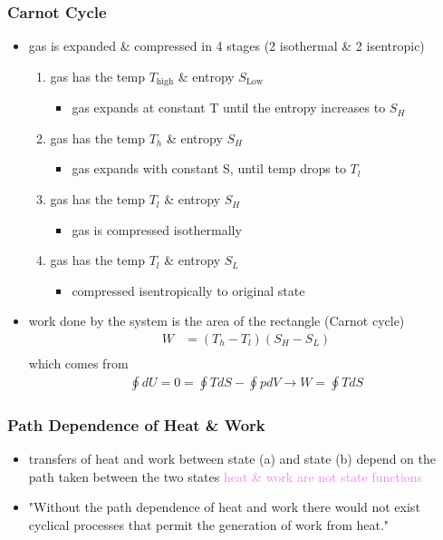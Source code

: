 \subsubsection{Carnot Cycle}
\begin{itemize}
	\item gas is expanded \& compressed in 4 stages (2 isothermal \& 2 isentropic)
	      \begin{enumerate}
		      \item gas has the temp $T_\text{high}$ \& entropy $S_\text{Low}$
		            \begin{itemize}
			            \item gas expands at constant T until the entropy increases to $S_H$
		            \end{itemize}
		      \item gas has the temp $T_h$ \& entropy $S_H$
		            \begin{itemize}
			            \item gas expands with constant S, until temp drops to $T_l$
		            \end{itemize}
		      \item gas has the temp $T_l$ \& entropy $S_H$
		            \begin{itemize}
			            \item gas is compressed isothermally
		            \end{itemize}
		      \item gas has the temp $T_l$ \& entropy $S_L$
		            \begin{itemize}
			            \item compressed isentropically to original state
		            \end{itemize}
	      \end{enumerate}
	\item work done by the system is the area of the rectangle (Carnot cycle)
	      \begin{align}
		      W & = (T_h - T_l) (S_H - S_L) \\
	      \end{align}
	      which comes from
	      \begin{align}
		      \oint dU = 0 = \oint TdS - \oint pdV \rightarrow W = \oint TdS
	      \end{align}
\end{itemize}


\subsubsection{Path Dependence of Heat \& Work }
\begin{itemize}
	\item transfers of heat and work between state (a) and state (b) depend on the path
	      taken between the two states \textcolor{violet}{heat \& work are not state functions}
	\item "Without the path dependence of heat and work there would not exist cyclical
	      processes that permit the generation of work from heat."
\end{itemize}

